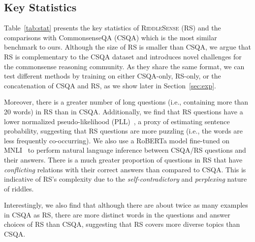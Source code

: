 \subsection{Key Statistics}
Table~\ref{tab:stat} presents the key statistics of \textsc{RiddleSense} (RS) and the comparisons with CommonsenseQA (CSQA) which is the most similar benchmark to ours.
Although the size of \textsc{RS} is smaller than CSQA,
we argue that \textsc{RS} is complementary to the CSQA dataset and introduces novel challenges for the commonsense reasoning community.
As they share the same format, we can test different methods by training on either CSQA-only, RS-only, or the concatenation of CSQA and RS, as we show later in Section~\ref{sec:exp}.

Moreover, there is a greater number of long questions (i.e., containing more than 20 words) in RS than in CSQA.
Additionally, we find that RS questions have a lower normalized pseudo-likelihood (PLL)~\cite{salazar2019masked}, a proxy of estimating sentence probability, suggesting that RS questions are more puzzling (i.e., the words are less frequently co-occurring).
We also use a RoBERTa model fine-tuned on MNLI~\cite{Williams2018ABC} to perform natural language inference between CSQA/RS questions and their answers.
There is a much greater proportion of questions in RS that have \textit{conflicting} relations with their correct answers than compared to CSQA. 
This is indicative of RS's complexity due to the \textit{self-contradictory} and \textit{perplexing} nature of riddles.

Interestingly, we also find that although there are about twice as many examples in CSQA as RS, there are more distinct words in the questions and answer choices of RS than CSQA, suggesting that RS covers more diverse topics than CSQA.



